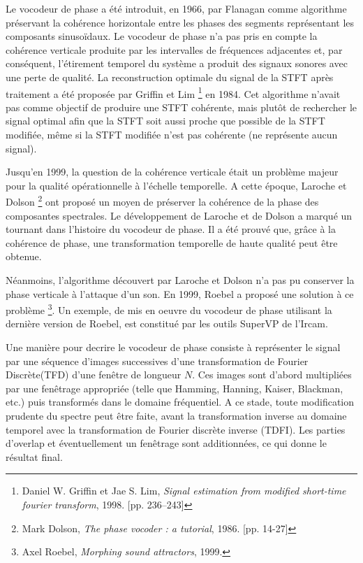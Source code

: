 Le vocodeur de phase a été introduit, en 1966, par Flanagan comme algorithme préservant la cohérence horizontale entre les phases des segments représentant les composants sinusoïdaux. Le vocodeur de phase n'a pas pris en compte la cohérence verticale produite par les intervalles de fréquences adjacentes et, par conséquent, l'étirement temporel du système a produit des signaux sonores avec une perte de qualité. La reconstruction optimale du signal de la STFT après traitement a été proposée par Griffin et Lim \footnote{Daniel W. Griffin et Jae S. Lim, \textit{Signal estimation from modified short-time fourier transform}, 1998. [pp. 236–243] \nocite{GrL84}} en 1984. Cet algorithme n'avait pas comme objectif de produire une STFT cohérente, mais plutôt de rechercher le signal optimal afin que la STFT soit aussi proche que possible de la STFT modifiée, même si la STFT modifiée n'est pas cohérente (ne représente aucun signal).

Jusqu'en 1999, la question de la cohérence verticale était un problème majeur pour la qualité opérationnelle à l'échelle temporelle. A cette époque, Laroche et Dolson \footnote{Mark Dolson, \textit{The phase vocoder : a tutorial}, 1986. [pp. 14-27] \nocite{Dol86} } ont proposé un moyen de préserver la cohérence de la phase des composantes spectrales. Le développement de Laroche et de Dolson a marqué un tournant dans l’histoire du vocodeur de phase. Il a été prouvé que, grâce à la cohérence de phase, une transformation temporelle de haute qualité peut être obtenue.

Néanmoins, l'algorithme découvert par Laroche et Dolson n'a pas pu conserver la phase verticale à l’attaque d’un son. En 1999, Roebel a proposé une solution à ce problème \footnote{Axel Roebel, \textit{ Morphing sound attractors}, 1999. \nocite{Rob99} }. Un exemple, de mis en oeuvre du vocodeur de phase utilisant la dernière version de Roebel, est constitué par les outils SuperVP de l’Ircam.

Une manière pour decrire le vocodeur de phase consiste à représenter le signal par une séquence d'images successives d’une transformation de Fourier Discrète(TFD) d’une fenêtre de longueur $ N$. Ces images sont d'abord multipliées par une fenêtrage appropriée (telle que Hamming, Hanning, Kaiser, Blackman, etc.) puis transformés dans le domaine fréquentiel. A ce stade, toute modification prudente du spectre peut être faite, avant la transformation inverse au domaine temporel avec la transformation de Fourier discrète inverse (TDFI). Les parties d'overlap et éventuellement un fenêtrage sont additionnées, ce qui donne le résultat final.

